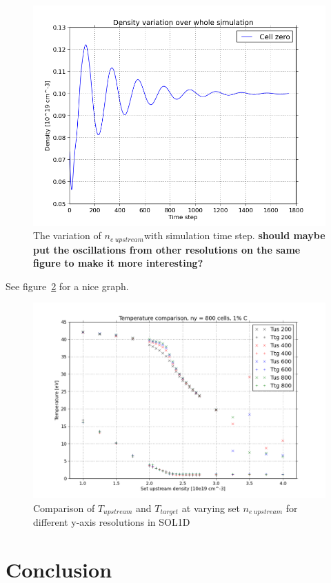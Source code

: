 \documentclass[11pt, twocolumn]{article}  %
\providecommand{\neus}{$n_{e~upstream}$} %
\begin{document}
\begin{figure}
\includegraphics[scale=0.4]{Figures/sol1d/ne_var_ny=800.PNG}
\centering
\caption{The variation of \neus with simulation time step. \textbf{should maybe put the oscillations from other resolutions on the same figure to make it more interesting?}}\label{fig:ne_var_ny=800}
\end{figure}



See figure~\ref{fig:TT_IMPCOMBO} for a nice graph.

\begin{figure}
\includegraphics[scale=0.4]{Figures/sol1d/TT_IMPCOMBO.PNG}
\centering
\caption{Comparison of $T_{upstream}$ and $T_{target}$ at varying set $n_{e~upstream}$ for different y-axis resolutions in SOL1D}\label{fig:TT_IMPCOMBO}
\end{figure}

\section{Conclusion}\label{sec:Conclusion}




\printbibliography
\end{document}
